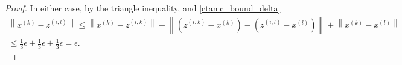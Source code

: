 \documentclass{article}
\theoremstyle{case}
\numberwithin{theorem}{subsection}
\newcommand{\dk}{\Delta_k}
\newcommand{\gmcik}{{\nabla m_{c_i}^{(k)}\left(\xk\right)}}
\newcommand{\gmcil}{{\nabla m_{c_i}^{(l)}\left(\xl\right)}}
\newcommand{\xk}{x^{(k)}}
\newcommand{\xl}{{x^{(l)}}}
\newcommand{\zik}{{z^{(i, k)}}}
\newcommand{\zil}{{z^{(i, l)}}}
\begin{document}
\begin{proof}
In either case, by the triangle inequality, and \cref{ctamc_bound_delta}
\begin{align*}
\left\|\xk - \zil \right\| \le 
\left\|\xk - \zik \right\|
+ \left\|\left(\zik - \xk\right) - \left(\zil - \xl\right)\right\|
+ \left\|\xk - \xl \right\| \\
\le \frac 1 3 \epsilon + \frac 1 3 \epsilon  + \frac 1 3 \epsilon = \epsilon.
\end{align*}

% 
% 
% 
% 
% 
\end{proof}
\end{document}
